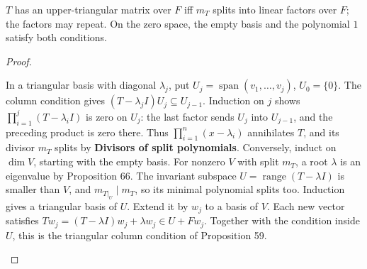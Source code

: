 \begin{proposition*}
$T$ has an upper-triangular matrix over $F$ iff $m_T$ splits into linear factors over $F$; the factors may repeat. On the zero space, the empty basis and the polynomial $1$ satisfy both conditions.
\end{proposition*}
\begin{prob}\begin{proof}\begin{steps}
\ii In a triangular basis with diagonal $\lambda_j$, put $U_j=\operatorname{span}(v_1,\ldots,v_j)$, $U_0=\{0\}$. The column condition gives $(T-\lambda_jI)U_j\subseteq U_{j-1}$. Induction on $j$ shows $\prod_{i=1}^j(T-\lambda_iI)$ is zero on $U_j$: the last factor sends $U_j$ into $U_{j-1}$, and the preceding product is zero there. Thus $\prod_{i=1}^n(x-\lambda_i)$ annihilates $T$, and its divisor $m_T$ splits by \textbf{Divisors of split polynomials}.
\ii Conversely, induct on $\dim V$, starting with the empty basis. For nonzero $V$ with split $m_T$, a root $\lambda$ is an eigenvalue by Proposition 66. The invariant subspace $U=\operatorname{range}(T-\lambda I)$ is smaller than $V$, and $m_{T|_U}\mid m_T$, so its minimal polynomial splits too. Induction gives a triangular basis of $U$.
\ii Extend it by $w_j$ to a basis of $V$. Each new vector satisfies $Tw_j=(T-\lambda I)w_j+\lambda w_j\in U+Fw_j$. Together with the condition inside $U$, this is the triangular column condition of Proposition 59.
\end{steps}\end{proof}\end{prob}
